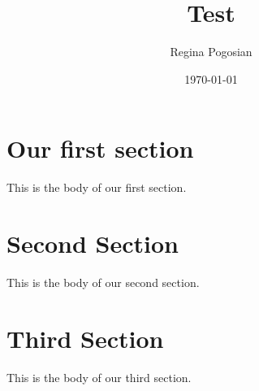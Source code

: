 \documentclass{article}
\title{Test}
\author{Regina Pogosian}
\date{\today}
\begin{document}
\section{Our first section}
This is the body of our first section.
\section{Second Section}
This is the body of our second section.
\section{Third Section}
This is the body of our third section.
\end{document}
